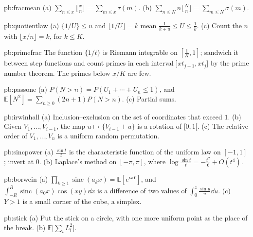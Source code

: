 \begin{hint}{pb:fracmean}
(a) $\sum_{n\le x}\lfloor\frac xn\rfloor=\sum_{m\le x}\tau(m)$. (b) $\sum_{n\le N}n\lfloor\frac Nn\rfloor=\sum_{m\le N}\sigma(m)$.
\end{hint}

\begin{hint}{pb:quotientlaw}
(a) $\{1/U\}\le u$ and $\lfloor 1/U\rfloor=k$ mean $\frac1{k+u}\le U\le\frac1k$. (c) Count the $n$ with $\lfloor x/n\rfloor=k$, for $k\le K$.
\end{hint}

\begin{hint}{pb:primefrac}
The function $\{1/t\}$ is Riemann integrable on $[\frac1K,1]$; sandwich it between step functions and count primes in each interval
$]xt_{j-1},xt_j]$ by the prime number theorem. The primes below $x/K$ are few.
\end{hint}

\begin{hint}{pb:passone}
(a) $P(N>n)=P(U_1+\cdots+U_n\le1)$, and $\mathbb E[N^2]=\sum_{n\ge0}(2n+1)P(N>n)$. (c) Partial sums.
\end{hint}

\begin{hint}{pb:irwinhall}
(a) Inclusion--exclusion on the set of coordinates that exceed $1$. (b) Given $V_1,\dots,V_{i-1}$, the map $u\mapsto\{V_{i-1}+u\}$ is a
rotation of $[0,1[$. (c) The relative order of $V_1,\dots,V_n$ is a uniform random permutation.
\end{hint}

\begin{hint}{pb:sincpower}
(a) $\frac{\sin t}t$ is the characteristic function of the uniform law on $[-1,1]$; invert at $0$. (b) Laplace's method on $[-\pi,\pi]$,
where $\log\frac{\sin t}t=-\frac{t^2}6+O(t^4)$.
\end{hint}

\begin{hint}{pb:borwein}
(a) $\prod_{k\ge1}\operatorname{sinc}(a_kx)=\mathbb E[e^{ixY}]$, and $\int_{-R}^R\operatorname{sinc}(a_0x)\cos(xy)\dd x$ is a difference of two values of
$\int_0^z\frac{\sin u}u\dd u$. (c) $Y>1$ is a small corner of the cube, a simplex.
\end{hint}

\begin{hint}{pb:stick}
(a) Put the stick on a circle, with one more uniform point as the place of the break. (b) $\mathbb E\bigl[\sum_iL_i^2\bigr]$.
\end{hint}

